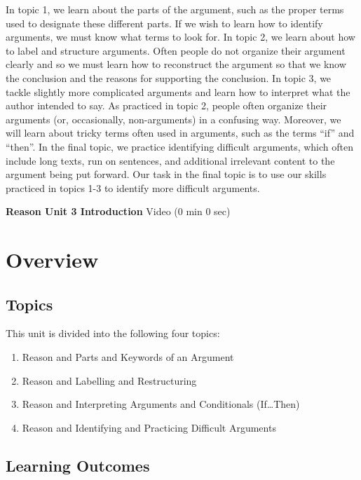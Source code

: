 \documentclass[
]{book}
\providecommand{\tightlist}{%
  \setlength{\itemsep}{0pt}\setlength{\parskip}{0pt}}
\begin{document}
In topic 1, we learn about the parts of the argument, such as the proper terms used to designate these different parts. If we wish to learn how to identify arguments, we must know what terms to look for. In topic 2, we learn about how to label and structure arguments. Often people do not organize their argument clearly and so we must learn how to reconstruct the argument so that we know the conclusion and the reasons for supporting the conclusion. In topic 3, we tackle slightly more complicated arguments and learn how to interpret what the author intended to say. As practiced in topic 2, people often organize their arguments (or, occasionally, non-arguments) in a confusing way. Moreover, we will learn about tricky terms often used in arguments, such as the terms ``if'' and ``then''. In the final topic, we practice identifying difficult arguments, which often include long texts, run on sentences, and additional irrelevant content to the argument being put forward. Our task in the final topic is to use our skills practiced in topics 1-3 to identify more difficult arguments.

\textbf{Reason Unit 3 Introduction} Video (0 min 0 sec)

\hypertarget{overview-2}{%
\section*{Overview}\label{overview-2}}

\hypertarget{topics-2}{%
\subsection*{Topics}\label{topics-2}}

This unit is divided into the following four topics:

\begin{enumerate}
\def\labelenumi{\arabic{enumi}.}
\tightlist
\item
  Reason and Parts and Keywords of an Argument
\item
  Reason and Labelling and Restructuring
\item
  Reason and Interpreting Arguments and Conditionals (If\ldots Then)
\item
  Reason and Identifying and Practicing Difficult Arguments
\end{enumerate}

\hypertarget{learning-outcomes-2}{%
\subsection*{Learning Outcomes}\label{learning-outcomes-2}}
\end{document}
